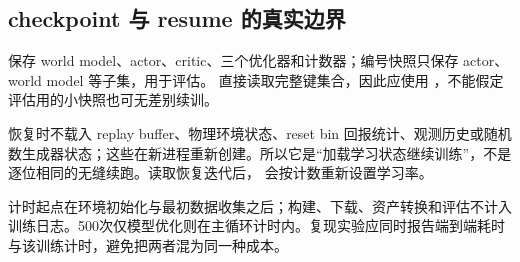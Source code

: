 \subsection{checkpoint 与 resume 的真实边界}
 保存 world model、actor、critic、三个优化器和计数器；编号快照只保存 actor、world model 等子集，用于评估。 直接读取完整键集合，因此应使用 ，不能假定评估用的小快照也可无差别续训。

恢复时不载入 replay buffer、物理环境状态、reset bin 回报统计、观测历史或随机数生成器状态；这些在新进程重新创建。所以它是“加载学习状态继续训练”，不是逐位相同的无缝续跑。读取恢复迭代后， 会按计数重新设置学习率。

计时起点在环境初始化与最初数据收集之后；构建、下载、资产转换和评估不计入训练日志。500次仅模型优化则在主循环计时内。复现实验应同时报告端到端耗时与该训练计时，避免把两者混为同一种成本。
